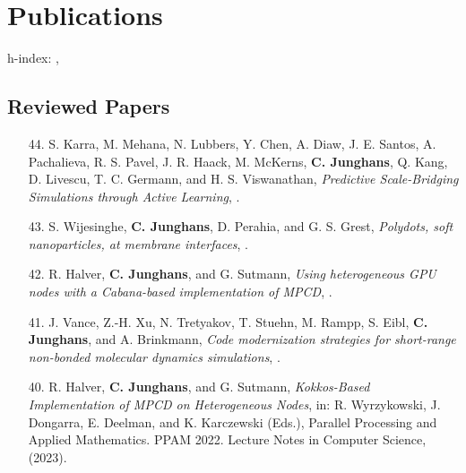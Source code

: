 \documentclass{article}
\begin{document}
\section*{Publications}

h-index: , 

\subsection*{Reviewed Papers}

\begin{enumerate}

\item[44.] S. Karra, M. Mehana, N. Lubbers, Y. Chen, A. Diaw, J. E. Santos, A. Pachalieva, R. S. Pavel, J. R. Haack, M. McKerns, \textbf{C. Junghans}, Q. Kang, D. Livescu, T. C. Germann, and H. S. Viswanathan, 
  \textit{Predictive Scale-Bridging Simulations through Active Learning},
  .

\item[43.] S. Wijesinghe, \textbf{C. Junghans}, D. Perahia, and G. S. Grest,
   \textit{Polydots, soft nanoparticles, at membrane interfaces},
    .

\item[42.] R. Halver, \textbf{C. Junghans}, and G. Sutmann,
   \textit{Using heterogeneous GPU nodes with a Cabana-based implementation of MPCD},
   .

\item[41.] J. Vance, Z.-H. Xu, N. Tretyakov, T. Stuehn, M. Rampp, S. Eibl, \textbf{C. Junghans}, and A. Brinkmann,
   \textit{Code modernization strategies for short-range non-bonded molecular dynamics simulations},
   .

\item[40.] R. Halver, \textbf{C. Junghans}, and G. Sutmann,
   \textit{Kokkos-Based Implementation of MPCD on Heterogeneous Nodes},
   in: R. Wyrzykowski, J. Dongarra, E. Deelman, and K. Karczewski (Eds.),
   Parallel Processing and Applied Mathematics. PPAM 2022. Lecture Notes in Computer Science,  (2023).


\end{enumerate}
\end{document}
